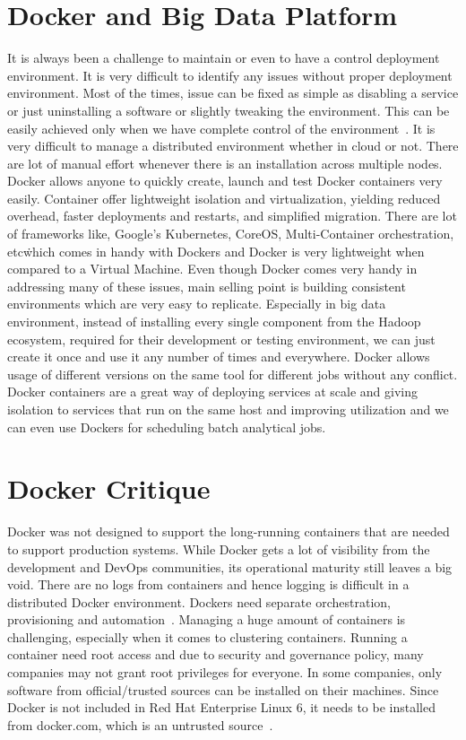 \section{Docker and Big Data Platform}

It is always been a challenge to maintain or even to have a control
deployment environment. It is very difficult to identify any issues
without proper deployment environment. Most of the times, issue can be
fixed as simple as disabling a service or just uninstalling a software
or slightly tweaking the environment. This can be easily achieved only
when we have complete control of the environment~\cite{simplebig}. It
is very difficult to manage a distributed environment whether in cloud
or not.  There are lot of manual effort whenever there is an
installation across multiple nodes. Docker allows anyone to quickly
create, launch and test Docker containers very easily. Container offer
lightweight isolation and virtualization, yielding reduced overhead,
faster deployments and restarts, and simplified migration. There are
lot of frameworks like, Google's Kubernetes, CoreOS, Multi-Container
orchestration, etc\. which comes in handy with Dockers and Docker is
very lightweight when compared to a Virtual Machine. Even though
Docker comes very handy in addressing many of these issues, main
selling point is building consistent environments which are very easy
to replicate. Especially in big data environment, instead of
installing every single component from the Hadoop ecosystem, required
for their development or testing environment, we can just create it
once and use it any number of times and everywhere. Docker allows
usage of different versions on the same tool for different jobs
without any conflict.  Docker containers are a great way of deploying
services at scale and giving isolation to services that run on the
same host and improving utilization and we can even use Dockers for
scheduling batch analytical jobs.
	
\section{Docker Critique}

Docker was not designed to support the long-running containers that
are needed to support production systems. While Docker gets a lot of
visibility from the development and DevOps communities, its
operational maturity still leaves a big void. There are no logs from
containers and hence logging is difficult in a distributed Docker
environment. Dockers need separate orchestration, provisioning and
automation~\cite{pitfall}. Managing a huge amount of containers is
challenging, especially when it comes to clustering
containers. Running a container need root access and due to security
and governance policy, many companies may not grant root privileges
for everyone. In some companies, only software from official/trusted
sources can be installed on their machines. Since Docker is not
included in Red Hat Enterprise Linux 6, it needs to be installed from
docker.com, which is an untrusted source~\cite{philip}.
	
